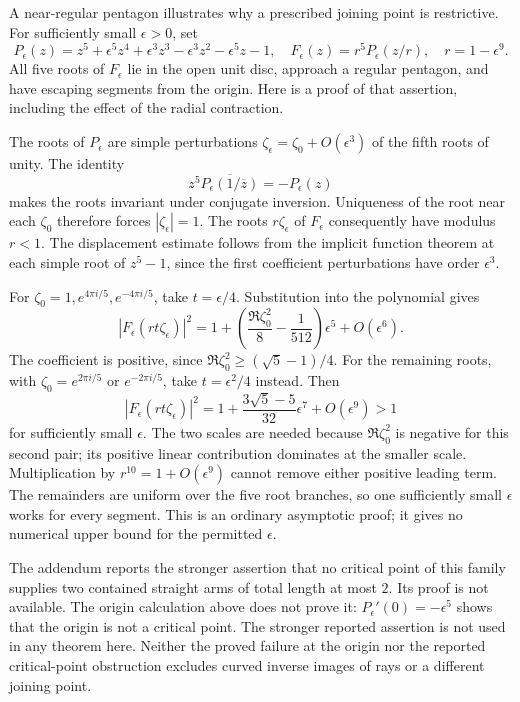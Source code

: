 \documentclass[11pt]{article}
\begin{document}
A near-regular pentagon illustrates why a prescribed joining point is
restrictive. For sufficiently small $\epsilon>0$, set
\[
 P_\epsilon(z)=z^5+\epsilon^5z^4+\epsilon^3z^3
              -\epsilon^3z^2-\epsilon^5z-1,
 \quad F_\epsilon(z)=r^5P_\epsilon(z/r),\quad r=1-\epsilon^9.
\]
All five roots of $F_\epsilon$ lie in the open unit disc, approach a
regular pentagon, and have escaping segments from the origin. Here is a
proof of that assertion, including the effect of the radial contraction.

The roots of $P_\epsilon$ are simple perturbations
$\zeta_\epsilon=\zeta_0+O(\epsilon^3)$ of the fifth roots of unity.
The identity
\[
 z^5\overline{P_\epsilon(1/\overline z)}=-P_\epsilon(z)
\]
makes the roots invariant under conjugate inversion. Uniqueness of the
root near each $\zeta_0$ therefore forces $|\zeta_\epsilon|=1$.
The roots $r\zeta_\epsilon$ of $F_\epsilon$ consequently have modulus
$r<1$. The displacement estimate follows from the implicit function
theorem at each simple root of $z^5-1$, since the first coefficient
perturbations have order $\epsilon^3$.

For $\zeta_0=1,e^{4\pi i/5},e^{-4\pi i/5}$, take $t=\epsilon/4$.
Substitution into the polynomial gives
\[
 |F_\epsilon(rt\zeta_\epsilon)|^2
 =1+\left(\frac{\Re\zeta_0^2}{8}-\frac1{512}\right)\epsilon^5
       +O(\epsilon^6).
\]
The coefficient is positive, since
$\Re\zeta_0^2\ge(\sqrt5-1)/4$.
For the remaining roots, with $\zeta_0=e^{2\pi i/5}$ or
$e^{-2\pi i/5}$, take $t=\epsilon^2/4$ instead. Then
\[
 |F_\epsilon(rt\zeta_\epsilon)|^2
 =1+\frac{3\sqrt5-5}{32}\epsilon^7+O(\epsilon^9)>1
\]
for sufficiently small $\epsilon$. The two scales are needed because
$\Re\zeta_0^2$ is negative for this second pair; its positive linear
contribution dominates at the smaller scale. Multiplication by
$r^{10}=1+O(\epsilon^9)$ cannot remove either positive leading term.
The remainders are uniform over the five root branches, so one sufficiently
small $\epsilon$ works for every segment. This is an ordinary asymptotic
proof; it gives no numerical upper bound for the permitted $\epsilon$.

The addendum \cite[Proposition~1]{revision2026} reports the stronger
assertion that no critical point of this family supplies two contained
straight arms of total length at most $2$. Its proof is not available.
The origin calculation above does not prove it: $P_\epsilon'(0)=-\epsilon^5$
shows that the origin is not a critical point. The stronger reported
assertion is not used in any theorem here. Neither the proved failure at
the origin nor the reported critical-point obstruction excludes curved
inverse images of rays or a different joining point.
\end{document}
